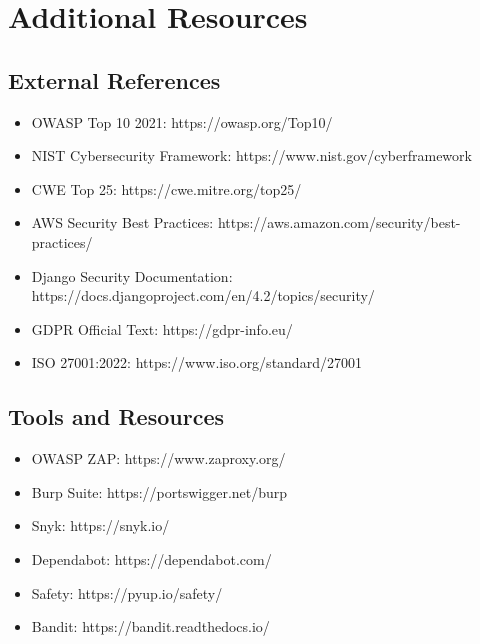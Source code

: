 \documentclass{report}
\begin{document}
\appendix

\chapter{Additional Resources}

\section{External References}
\begin{itemize}
\item OWASP Top 10 2021: https://owasp.org/Top10/
\item NIST Cybersecurity Framework: https://www.nist.gov/cyberframework
\item CWE Top 25: https://cwe.mitre.org/top25/
\item AWS Security Best Practices: https://aws.amazon.com/security/best-practices/
\item Django Security Documentation: https://docs.djangoproject.com/en/4.2/topics/security/
\item GDPR Official Text: https://gdpr-info.eu/
\item ISO 27001:2022: https://www.iso.org/standard/27001
\end{itemize}

\section{Tools and Resources}
\begin{itemize}
\item OWASP ZAP: https://www.zaproxy.org/
\item Burp Suite: https://portswigger.net/burp
\item Snyk: https://snyk.io/
\item Dependabot: https://dependabot.com/
\item Safety: https://pyup.io/safety/
\item Bandit: https://bandit.readthedocs.io/
\end{itemize}
\end{document}
